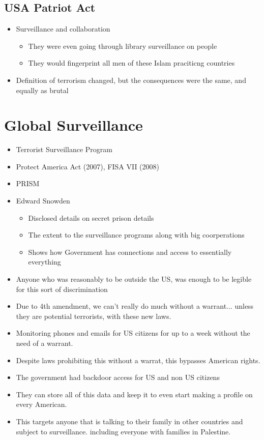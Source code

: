 \documentclass{article}
\begin{document}
\subsection{USA Patriot Act}
\begin{itemize}
  \item Surveillance and collaboration
    \begin{itemize}
      \item They were even going through library surveillance on people
      \item They would fingerprint all men of these Islam praciticng countries
    \end{itemize}
  \item Definition of terrorism changed, but the consequences were the same, and
    equally as brutal
\end{itemize}

\section{Global Surveillance}
\begin{itemize}
  \item Terrorist Surveillance Program
  \item Protect America Act (2007), FISA VII (2008)
  \item PRISM
  \item Edward Snowden
    \begin{itemize}
      \item Disclosed details on secret prison details
      \item The extent to the surveillance programs
        along with big coorperations
      \item Shows how Government has connections and access to essentially
        everything
    \end{itemize}
  \item Anyone who was reasonably to be outside the US, was enough
    to be legible for this sort of discrimination
  \item Due to 4th amendment, we can't really do much without a warrant...
    unless they are potential terrorists, with these new laws.
  \item Monitoring phones and emails for US citizens for up to a week without the
    need of a warrant.
  \item Despite laws prohibiting this without a warrat, this bypasses American rights.
  \item The government had backdoor access for US and non US citizens
  \item They can store all of this data and keep it to even start making a profile
    on every American.
  \item This targets anyone that is talking to their family in other countries
    and subject to surveillance. including everyone with families in Palestine.
\end{itemize}
\end{document}
